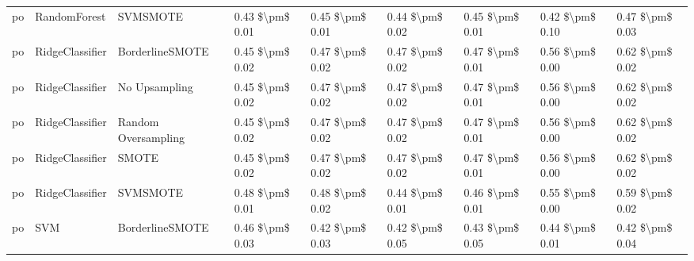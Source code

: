 \begin{tabular}{lllllllll}
      po &                    RandomForest &                      SVMSMOTE &     0.43 \$\textbackslash pm\$ 0.01 &           0.45 \$\textbackslash pm\$ 0.01 &       0.44 \$\textbackslash pm\$ 0.02 &        0.45 \$\textbackslash pm\$ 0.01 &                         0.42 \$\textbackslash pm\$ 0.10 &     0.47 \$\textbackslash pm\$ 0.03 \\
      po &                 RidgeClassifier &               BorderlineSMOTE &     0.45 \$\textbackslash pm\$ 0.02 &           0.47 \$\textbackslash pm\$ 0.02 &       0.47 \$\textbackslash pm\$ 0.02 &        0.47 \$\textbackslash pm\$ 0.01 &                         0.56 \$\textbackslash pm\$ 0.00 &     0.62 \$\textbackslash pm\$ 0.02 \\
      po &                 RidgeClassifier &                 No Upsampling &     0.45 \$\textbackslash pm\$ 0.02 &           0.47 \$\textbackslash pm\$ 0.02 &       0.47 \$\textbackslash pm\$ 0.02 &        0.47 \$\textbackslash pm\$ 0.01 &                         0.56 \$\textbackslash pm\$ 0.00 &     0.62 \$\textbackslash pm\$ 0.02 \\
      po &                 RidgeClassifier &           Random Oversampling &     0.45 \$\textbackslash pm\$ 0.02 &           0.47 \$\textbackslash pm\$ 0.02 &       0.47 \$\textbackslash pm\$ 0.02 &        0.47 \$\textbackslash pm\$ 0.01 &                         0.56 \$\textbackslash pm\$ 0.00 &     0.62 \$\textbackslash pm\$ 0.02 \\
      po &                 RidgeClassifier &                         SMOTE &     0.45 \$\textbackslash pm\$ 0.02 &           0.47 \$\textbackslash pm\$ 0.02 &       0.47 \$\textbackslash pm\$ 0.02 &        0.47 \$\textbackslash pm\$ 0.01 &                         0.56 \$\textbackslash pm\$ 0.00 &     0.62 \$\textbackslash pm\$ 0.02 \\
      po &                 RidgeClassifier &                      SVMSMOTE &     0.48 \$\textbackslash pm\$ 0.01 &           0.48 \$\textbackslash pm\$ 0.02 &       0.44 \$\textbackslash pm\$ 0.01 &        0.46 \$\textbackslash pm\$ 0.01 &                         0.55 \$\textbackslash pm\$ 0.00 &     0.59 \$\textbackslash pm\$ 0.02 \\
      po &                             SVM &               BorderlineSMOTE &     0.46 \$\textbackslash pm\$ 0.03 &           0.42 \$\textbackslash pm\$ 0.03 &       0.42 \$\textbackslash pm\$ 0.05 &        0.43 \$\textbackslash pm\$ 0.05 &                         0.44 \$\textbackslash pm\$ 0.01 &     0.42 \$\textbackslash pm\$ 0.04 \\

\end{tabular}
